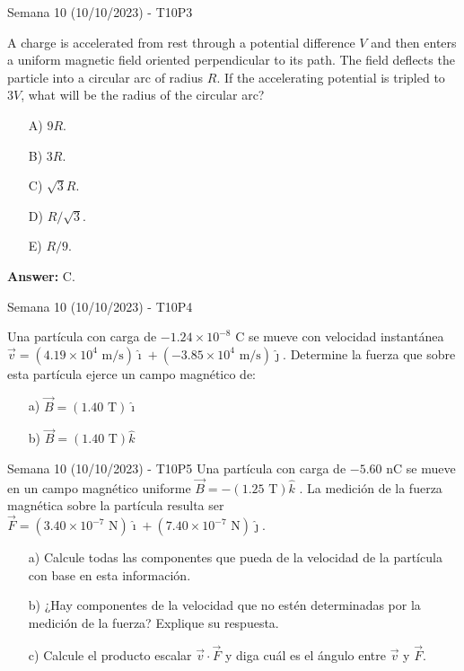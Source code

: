 \begin{frame}{Semana 10 (10/10/2023) - T10P3}
    
    A charge is accelerated from rest through a potential difference $V$ and then enters a uniform magnetic field oriented perpendicular to its path. The field deflects the particle into a circular arc of radius $R$. If the accelerating potential is tripled to $3V$, what will be the radius of the circular arc?
    
    \begin{itemize}
       \item[A)] $9R$.
       \item[B)] $3R$.
       \item[C)] $\sqrt{3}R$.
       \item[D)] $R/\sqrt{3}$.
       \item[E)] $R/9$.
   \end{itemize}
    
    \pause \centering \textbf{Answer:} C.
    
\end{frame}

\begin{frame}{Semana 10 (10/10/2023) - T10P4}
    
    Una partícula con carga de $-1.24 \times10^{-8}$ C se mueve con
velocidad instantánea $\vec{v}= (4.19 \times 10^4 \text{ m/s})\hat{\imath} + (-3.85 \times 10^4 \text{ m/s})\hat{\jmath}$.
Determine la fuerza que sobre esta partícula ejerce un campo magnético de:
\begin{itemize}
    \item[a)] $\vec{B} = (1.40 \text{ T})\hat{\imath}$
    \item[b)] $\vec{B} = (1.40 \text{ T})\hat{k}$
\end{itemize}
    
\end{frame}

\begin{frame}{Semana 10 (10/10/2023) - T10P5}
    Una partícula con carga de $-5.60$ nC se mueve en un
campo magnético uniforme $\vec{B}=-(1.25 \text{ T})\hat{k}$ . La medición de la fuerza magnética sobre la partícula resulta ser $\vec{F}=(3.40 \times 10^{-7} \text{ N})\hat{\imath} + (7.40 \times 10^{-7} \text{ N})\hat{\jmath}$.

\begin{itemize}
    \item[a)] Calcule todas las componentes que pueda de la velocidad de la partícula con base en esta información.
    \item[b)] ¿Hay componentes de la velocidad que no estén determinadas por la medición 
de la fuerza? Explique su respuesta.
    \item[c)] Calcule el producto escalar $\vec{v}\cdot\vec{F}$ y diga cuál es el ángulo entre $\vec{v}$ y $\vec{F}$.
\end{itemize}
\end{frame}

